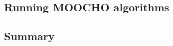 \documentclass[pdf,ps2pdf,11pt]{SANDreport}
\begin{document}
%
\subsection{Running MOOCHO algorithms}
%

%
\subsection{Summary}
%

%
\clearpage



%
\appendix


\end{document}
